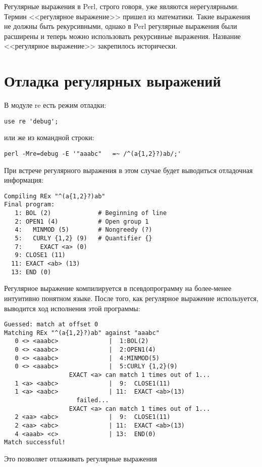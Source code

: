 Регулярные выражения в Perl, строго говоря, уже являются нерегулярными. Термин <<регулярное выражение>> пришел из математики. Такие выражения не должны быть рекурсивными, однако в Perl регулярные выражения были расширены и теперь можно использовать рекурсивные выражения. Название <<регулярное выражение>> закрепилось исторически.

\section{Отладка регулярных выражений}
В модуле re есть режим отладки:
\begin{verbatim}
use re 'debug';
\end{verbatim}
или же из командной строки:
\begin{verbatim}
perl -Mre=debug -E '"aaabc"   =~ /^(a{1,2}?)ab/;'
\end{verbatim}
При встрече регулярного выражения в этом случае будет выводиться отладочная информация:
\begin{verbatim}
Compiling REx "^(a{1,2}?)ab"
Final program:
   1: BOL (2)             # Beginning of line
   2: OPEN1 (4)           # Open group 1
   4:   MINMOD (5)        # Nongreedy (?)
   5:   CURLY {1,2} (9)   # Quantifier {}
   7:     EXACT <a> (0)
   9: CLOSE1 (11)
  11: EXACT <ab> (13)
  13: END (0)
\end{verbatim}
Регулярное выражение компилируется в псевдопрограмму на более-менее интуитивно понятном языке. После того, как регулярное выражение используется, выводится ход исполнения этой программы:
\begin{verbatim}
Guessed: match at offset 0
Matching REx "^(a{1,2}?)ab" against "aaabc"
   0 <> <aaabc>              |  1:BOL(2)
   0 <> <aaabc>              |  2:OPEN1(4)
   0 <> <aaabc>              |  4:MINMOD(5)
   0 <> <aaabc>              |  5:CURLY {1,2}(9)
                  EXACT <a> can match 1 times out of 1...
   1 <a> <aabc>              |  9:  CLOSE1(11)
   1 <a> <aabc>              | 11:  EXACT <ab>(13)
                    failed...
                  EXACT <a> can match 1 times out of 1...
   2 <aa> <abc>              |  9:  CLOSE1(11)
   2 <aa> <abc>              | 11:  EXACT <ab>(13)
   4 <aaab> <c>              | 13:  END(0)
Match successful!
\end{verbatim}
Это позволяет отлаживать регулярные выражения

